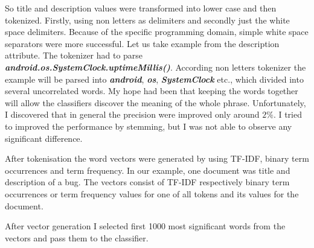 So title and description values were transformed into lower case
and then tokenized. Firstly, using non letters as delimiters and
secondly just the white space delimiters. Because of the
specific programming domain, simple white space separators were
more successful. Let us take example from the description
attribute. The tokenizer had to parse {\bf {\it
android.os.SystemClock.uptimeMillis()}}. According non letters
tokenizer the example will be parsed into {\bf {\it android}},
{\bf {\it os}}, {\bf {\it SystemClock}} etc., which divided into
several uncorrelated words. My hope had been that keeping the
words together will allow the classifiers discover the meaning
of the whole phrase. Unfortunately, I discovered that in general
the precision were improved only around $2\%$. I tried to
improved the performance by stemming, but I was not able to
observe any significant difference.

After tokenisation the word vectors were generated by using TF-IDF, binary term occurrences and term frequency.
In our example, one document was title and description of a bug.
The vectors consist of TF-IDF respectively binary term occurrences or term frequency values for one of all tokens and its values for the document.

After vector generation I selected first 1000 most significant words from the vectors and pass them to the classifier.

